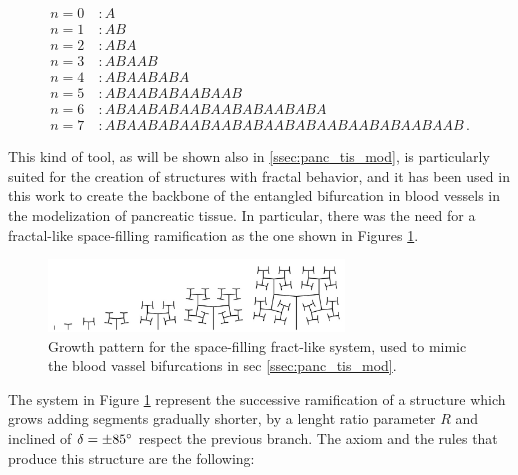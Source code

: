     \begin{align}
        n = 0 &\ : A \nonumber \\
        n = 1 &\ : AB \nonumber \\
        n = 2 &\ : ABA \nonumber \\
        n = 3 &\ : ABAAB \nonumber \\
        n = 4 &\ : ABAABABA \nonumber \\
        n = 5 &\ : ABAABABAABAAB \nonumber \\
        n = 6 &\ : ABAABABAABAABABAABABA \nonumber \\
        n = 7 &\ : ABAABABAABAABABAABABAABAABABAABAAB\,. \nonumber
    \end{align}

    This kind of tool, as will be shown also in \ref{ssec:panc_tis_mod}, is particularly suited for the creation of structures with fractal behavior, and it has been used in this work to create the backbone of the entangled bifurcation in blood vessels in the modelization of pancreatic tissue. In particular, there was the need for a fractal-like space-filling ramification as the one shown in Figures \ref{fig:bf_ls}. %

    \begin{figure}
        \centering
        \includegraphics[width = 0.7\textwidth]{images/bf_ls}
        \caption{Growth pattern for the space-filling fract-like system, used to mimic the blood vassel bifurcations in sec \ref{ssec:panc_tis_mod}.}
        \label{fig:bf_ls}
    \end{figure}


    The system in Figure \ref{fig:bf_ls} represent the successive ramification of a structure which grows adding segments gradually shorter, by a lenght ratio parameter $R$ and inclined of $\delta = \pm 85 \degree$ respect the previous branch. The axiom and the rules that produce this structure are the following:


